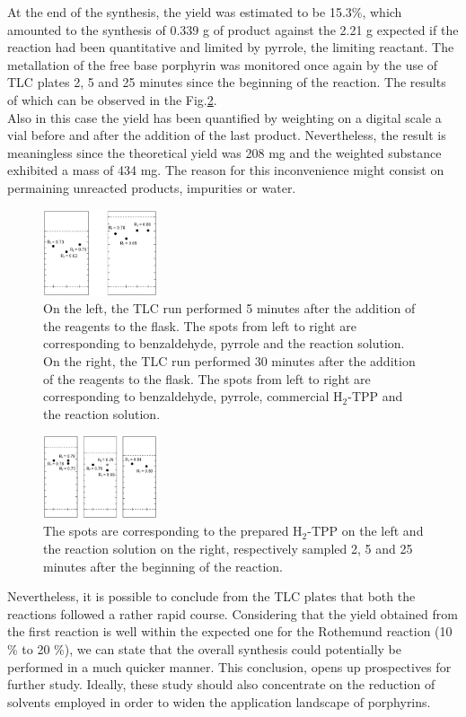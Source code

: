 \documentclass[twoside,twocolumn,9pt]{article}
\begin{document}
At the end of the synthesis, the yield was estimated to be 15.3\%, which amounted to the synthesis of 0.339 g of product against the 2.21 g expected if the reaction had been quantitative and limited by pyrrole, the limiting reactant.
The metallation of the free base porphyrin was monitored once again by the use of TLC plates 2, 5 and 25 minutes since the beginning of the reaction.
The results of which can be observed in the Fig.\ref{TLC-Zn-TPP}.\\
Also in this case the yield has been quantified by weighting on a digital scale a vial before and after the addition of the last product.
Nevertheless, the result is meaningless since the theoretical yield was 208 mg and the weighted substance exhibited a mass of 434 mg.
The reason for this inconvenience might consist on permaining unreacted products, impurities or water.
\begin{figure}
	\includegraphics[width=0.3\textwidth]{TLC-h2-TPP}
	\caption{On the left, the TLC run performed 5 minutes after the addition of the reagents to the flask. The spots from left to right are corresponding to benzaldehyde, pyrrole and the reaction solution. On the right, the TLC run performed 30 minutes after the addition of the reagents to the flask. The spots from left to right are corresponding to benzaldehyde, pyrrole, commercial H$_{2}$-TPP and the reaction solution.}
	\label{tlc-h2tpp}
\end{figure}
\begin{figure}
	\includegraphics[width=0.3\textwidth]{TLC-Zn-TPP}
	\caption{The spots are corresponding to the prepared H$_{2}$-TPP on the left and the reaction solution on the right, respectively sampled 2, 5 and 25 minutes after the beginning of the reaction.}
	\label{TLC-Zn-TPP}
\end{figure}
Nevertheless, it is possible to conclude from the TLC plates that both the reactions followed a rather rapid course.
Considering that the yield obtained from the first reaction is well within the expected one for the Rothemund reaction (10 \% to 20 \%), we can state that the overall synthesis could potentially be performed in a much quicker manner.
This conclusion, opens up prospectives for further study.
Ideally, these study should also concentrate on the reduction of solvents employed in order to widen the application landscape of porphyrins.
\end{document}
